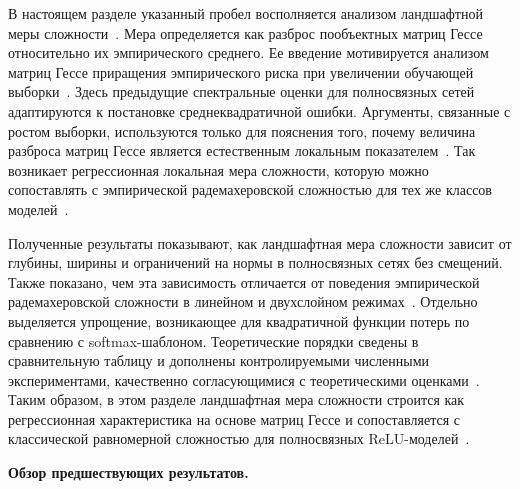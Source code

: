 В настоящем разделе указанный пробел восполняется анализом ландшафтной меры сложности~\cite{grabovoi2024unraveling748584228}.
Мера определяется как разброс пообъектных матриц Гессе относительно их эмпирического среднего. Ее введение мотивируется анализом матриц Гессе приращения эмпирического риска при увеличении обучающей выборки~\cite{grabovoi2024unraveling748584228}.
Здесь предыдущие спектральные оценки для полносвязных сетей адаптируются к постановке среднеквадратичной ошибки. Аргументы, связанные с ростом выборки, используются только для пояснения того, почему величина разброса матриц Гессе является естественным локальным показателем~\cite{grabovoi2024unraveling748584228, skorski2019chainruleshessianhigher}.
Так возникает регрессионная локальная мера сложности, которую можно сопоставлять с эмпирической радемахеровской сложностью для тех же классов моделей~\cite{bartlett2002rademacher, vapnik1998, grabovoi2024unraveling748584228}.

Полученные результаты показывают, как ландшафтная мера сложности зависит от глубины, ширины и ограничений на нормы в полносвязных сетях без смещений. Также показано, чем эта зависимость отличается от поведения эмпирической радемахеровской сложности в линейном и двухслойном режимах~\cite{bartlett2002rademacher, harvey2019jmlr, grabovoi2024unraveling748584228}.
Отдельно выделяется упрощение, возникающее для квадратичной функции потерь по сравнению с softmax-шаблоном. Теоретические порядки сведены в сравнительную таблицу и дополнены контролируемыми численными экспериментами, качественно согласующимися с теоретическими оценками~\cite{grabovoi2024unraveling748584228}.
Таким образом, в этом разделе ландшафтная мера сложности строится как регрессионная характеристика на основе матриц Гессе и сопоставляется с классической равномерной сложностью для полносвязных ReLU-моделей~\cite{bartlett2002rademacher, vapnik1998, grabovoi2024unraveling748584228}.

\label{ch1lc:sec:related}
\textbf{Обзор предшествующих результатов.}

